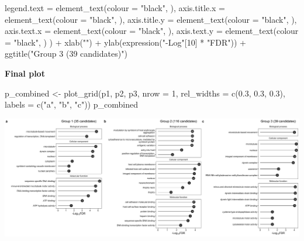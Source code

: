 \documentclass[
  11pt,
  oneside]{book}
\newenvironment{Shaded}{\begin{snugshade}}{\end{snugshade}}
\newcommand{\AttributeTok}[1]{\textcolor[rgb]{0.77,0.63,0.00}{#1}}
\newcommand{\DecValTok}[1]{\textcolor[rgb]{0.00,0.00,0.81}{#1}}
\newcommand{\FloatTok}[1]{\textcolor[rgb]{0.00,0.00,0.81}{#1}}
\newcommand{\FunctionTok}[1]{\textcolor[rgb]{0.00,0.00,0.00}{#1}}
\newcommand{\NormalTok}[1]{#1}
\newcommand{\OtherTok}[1]{\textcolor[rgb]{0.56,0.35,0.01}{#1}}
\newcommand{\SpecialCharTok}[1]{\textcolor[rgb]{0.00,0.00,0.00}{#1}}
\newcommand{\StringTok}[1]{\textcolor[rgb]{0.31,0.60,0.02}{#1}}
\begin{document}
\begin{Shaded}
\begin{Highlighting}[]
    \AttributeTok{legend.text =} \FunctionTok{element\_text}\NormalTok{(}\AttributeTok{colour =} \StringTok{"black"}\NormalTok{, ),}
    \AttributeTok{axis.title.x =} \FunctionTok{element\_text}\NormalTok{(}\AttributeTok{colour =} \StringTok{"black"}\NormalTok{, ),}
    \AttributeTok{axis.title.y =} \FunctionTok{element\_text}\NormalTok{(}\AttributeTok{colour =} \StringTok{"black"}\NormalTok{, ),}
    \AttributeTok{axis.text.x =} \FunctionTok{element\_text}\NormalTok{(}\AttributeTok{colour =} \StringTok{"black"}\NormalTok{, ),}
    \AttributeTok{axis.text.y =} \FunctionTok{element\_text}\NormalTok{(}\AttributeTok{colour =} \StringTok{"black"}\NormalTok{, )}
\NormalTok{  ) }\SpecialCharTok{+}
  \FunctionTok{xlab}\NormalTok{(}\StringTok{""}\NormalTok{) }\SpecialCharTok{+}
  \FunctionTok{ylab}\NormalTok{(}\FunctionTok{expression}\NormalTok{(}\StringTok{"{-}Log"}\NormalTok{[}\DecValTok{10}\NormalTok{] }\SpecialCharTok{*} \StringTok{"FDR"}\NormalTok{)) }\SpecialCharTok{+}
  \FunctionTok{ggtitle}\NormalTok{(}\StringTok{"Group 3 (39 candidates)"}\NormalTok{)}
\end{Highlighting}
\end{Shaded}

\textbf{Final plot}

\begin{Shaded}
\begin{Highlighting}[]
\NormalTok{p\_combined }\OtherTok{\textless{}{-}} \FunctionTok{plot\_grid}\NormalTok{(p1, p2, p3, }\AttributeTok{nrow =} \DecValTok{1}\NormalTok{, }\AttributeTok{rel\_widths =} \FunctionTok{c}\NormalTok{(}\FloatTok{0.3}\NormalTok{, }\FloatTok{0.3}\NormalTok{, }\FloatTok{0.3}\NormalTok{), }\AttributeTok{labels =} \FunctionTok{c}\NormalTok{(}\StringTok{"a"}\NormalTok{, }\StringTok{"b"}\NormalTok{, }\StringTok{"c"}\NormalTok{))}
\NormalTok{p\_combined}
\end{Highlighting}
\end{Shaded}

\begin{center}\includegraphics[width=1\linewidth]{./figures/Supplementary Fig 13} \end{center}
\end{document}
